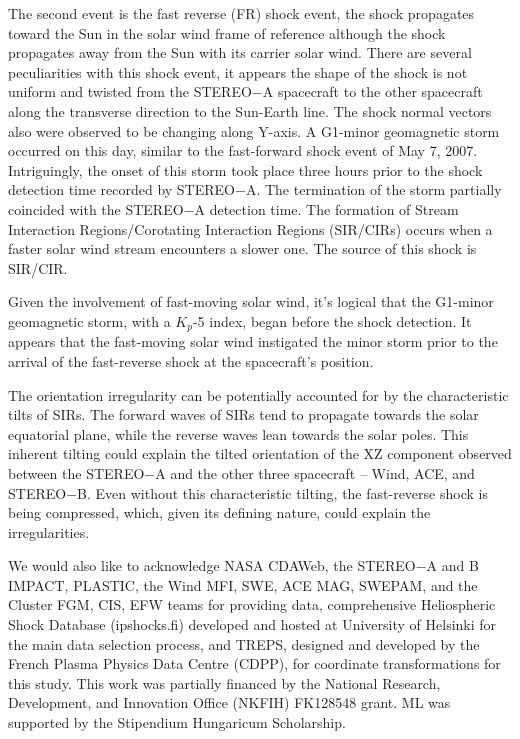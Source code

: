 \documentclass[draft]{agujournal2019}
\begin{document}
The second event is the fast reverse (FR) shock event, the shock propagates toward the Sun in the solar wind frame of reference although the shock propagates away from the Sun with its carrier solar wind. There are several peculiarities with this shock event, it appears the shape of the shock is not uniform and twisted from the STEREO$-$A spacecraft to the other spacecraft along the transverse direction to the Sun-Earth line. The shock normal vectors also were observed to be changing along Y-axis. A G1-minor geomagnetic storm occurred on this day, similar to the fast-forward shock event of May 7, 2007. Intriguingly, the onset of this storm took place three hours prior to the shock detection time recorded by STEREO$-$A. The termination of the storm partially coincided with the STEREO$-$A detection time. The formation of Stream Interaction Regions/Corotating Interaction Regions (SIR/CIRs) occurs when a faster solar wind stream encounters a slower one. The source of this shock is SIR/CIR.

Given the involvement of fast-moving solar wind, it's logical that the G1-minor geomagnetic storm, with a $K_{p}$-5 index, began before the shock detection. It appears that the fast-moving solar wind instigated the minor storm prior to the arrival of the fast-reverse shock at the spacecraft's position.

 The orientation irregularity can be potentially accounted for by the characteristic tilts of SIRs. The forward waves of SIRs tend to propagate towards the solar equatorial plane, while the reverse waves lean towards the solar poles. This inherent tilting could explain the tilted orientation of the XZ component observed between the STEREO$-$A and the other three spacecraft – Wind, ACE, and STEREO$-$B. Even without this characteristic tilting, the fast-reverse shock is being compressed, which, given its defining nature, could explain the irregularities.  




%
%

\acknowledgments
 We would also like to acknowledge NASA CDAWeb, the STEREO$-$A and B IMPACT, PLASTIC, the Wind MFI, SWE, ACE MAG, SWEPAM, and the Cluster FGM, CIS, EFW teams for providing data, comprehensive Heliospheric Shock Database (ipshocks.fi) developed and hosted at University of Helsinki for the main data selection process, and TREPS, designed and developed by the French Plasma Physics Data Centre (CDPP), for coordinate transformations for this study.  This work was partially financed by the National Research, Development, and Innovation Office (NKFIH) FK128548 grant. ML was supported by the Stipendium Hungaricum Scholarship. 
\end{document}

